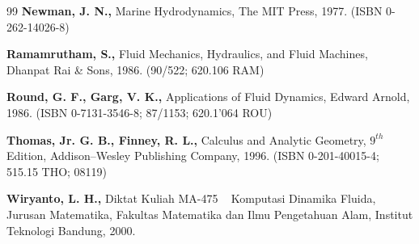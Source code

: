 \documentclass[12pt,a4paper]{report}
\begin{document}
\begin{thebibliography}{99}
  \textbf{Newman, J. N.,} Marine Hydrodynamics, The MIT Press,
1977. (ISBN 0-262-14026-8)

  \textbf{Ramamrutham, S.,} Fluid Mechanics, Hydraulics, and
Fluid Machines, Dhanpat Rai \& Sons, 1986. (90/522; 620.106 RAM)

  \textbf{Round, G. F., Garg, V. K.,} Applications of Fluid
Dynamics, Edward Arnold, 1986. (ISBN 0-7131-3546-8; 87/1153; 620.1'064 ROU)

  \textbf{Thomas, Jr. G. B., Finney, R. L.,} Calculus and
Analytic Geometry, $9^{th}$ Edition, Addison--Wesley Publishing Company,
1996. (ISBN 0-201-40015-4; 515.15 THO; 08119)

  \textbf{Wiryanto, L. H.,} Diktat Kuliah MA-475 {\ } Komputasi
Dinamika Fluida, Jurusan Matematika, Fakultas Matematika dan Ilmu
Pengetahuan Alam, Institut Teknologi Bandung, 2000.
\end{thebibliography}
\end{document}

